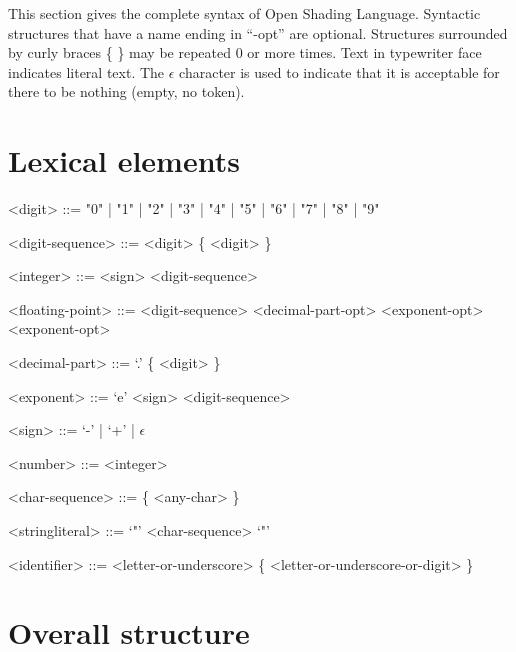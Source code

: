\documentclass[11pt,letterpaper]{book}
\def\langname{Open Shading Language\xspace}
\begin{document}
This section gives the complete syntax of \langname.  Syntactic
structures that have a name ending in ``-opt'' are optional.  Structures
surrounded by curly braces \{ \} may be repeated 0 or more times.  Text
in {\cf typewriter} face indicates literal text.  The $\epsilon$
character is used to indicate that it is acceptable for there to be
nothing (empty, no token).

\setlength{\grammarindent}{2cm}

\section*{Lexical elements}

\begin{grammar}

<digit> ::= "0" | "1" | "2" | "3" | "4" | "5" | "6" | "7" | "8" | "9"

<digit-sequence> ::= <digit> \{ <digit> \}

<integer> ::= <sign> <digit-sequence>

<floating-point> ::= <digit-sequence> <decimal-part-opt> <exponent-opt>
 <exponent-opt>

<decimal-part> ::= `.' \{ <digit> \}

<exponent> ::= `e' <sign> <digit-sequence>

<sign> ::= `-' | `+' | $\epsilon$

<number> ::= <integer>

<char-sequence> ::= \{ <any-char> \} 

<stringliteral> ::= `"' <char-sequence> `"'

<identifier> ::= <letter-or-underscore> \{ <letter-or-underscore-or-digit> \}

\end{grammar}

\section*{Overall structure}
\end{document}
